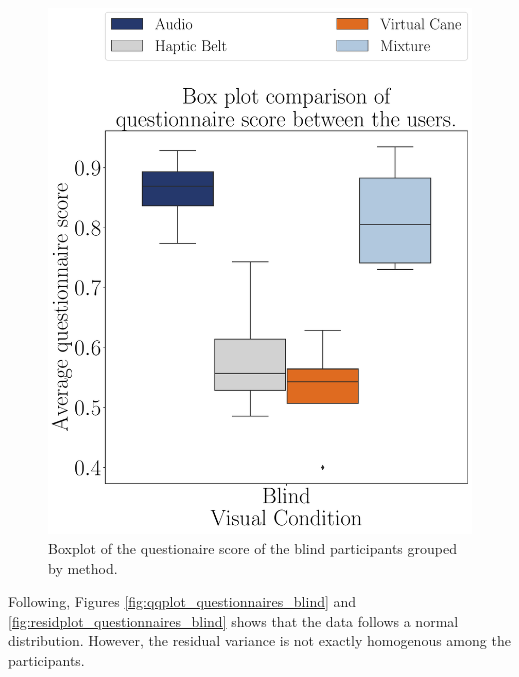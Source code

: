 \begin{figure}[!htb]
    \centering
    \includegraphics[width = 0.6\linewidth]{Resultados/Questionario/Figuras/pdf/boxplot_questionnaire_scene_blind.pdf}
    \caption{Boxplot of the questionaire score of the blind participants grouped by method.}
    \label{fig:boxplot_quest_blind_scene}
\end{figure}

%
%

Following, Figures \ref{fig:qqplot_questionnaires_blind} and \ref{fig:residplot_questionnaires_blind} shows that the data follows a normal distribution. However, the residual variance is not exactly homogenous among the participants. 

